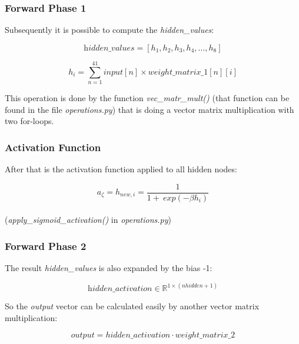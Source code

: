 \documentclass[10pt,a4paper]{article}
\begin{document}
	\subsubsection{Forward Phase 1}
	Subsequently it is possible to compute the \textit{hidden\_values}:
	\begin{center}
		\begin{equation}
		\textit{hidden\_values} = [h_1,h_2,h_3,h_4,...,h_8]
		\end{equation} 
	\end{center}

	\begin{center}
		\begin{equation}
		h_i = \sum_{n=1}^{41} input[n] \times weight\_matrix\_1[n][i] 
		\end{equation} 
	\end{center}
	This operation is done by the function \textit{ vec\_matr\_mult()} (that function can be found in the file \textit{operations.py}) that is doing a vector matrix multiplication with two for-loops. \\
	\subsubsection{Activation Function}
	After that is the activation function applied to all hidden nodes:
	\begin{center}
		\begin{equation}
		a_{\zeta} = h_{new, i} = \frac{1}{1 + \ exp(-\beta h_i)} 
		\end{equation} 
		\\ (\textit{apply\_sigmoid\_activation()} in \textit{operations.py})
	\end{center}
	\subsubsection{Forward Phase 2}
	The result \textit{hidden\_values} is also expanded by the bias -1: 
	\begin{center}
		\begin{equation}
		\textit{hidden\_activation} \in \mathbb{R}^{1\times (nhidden +1)} 
		\end{equation} 
	\end{center}
	 So the \textit{output} vector can be calculated easily by another vector matrix multiplication:
	  \begin{center}
	  	\begin{equation}
	  	\textit{output} = hidden\_activation \cdot weight\_matrix\_2 
	  	\end{equation} 
	  \end{center}
\end{document}
